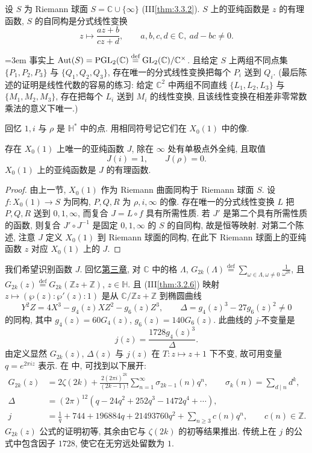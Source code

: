设 $S$ 为 Riemann 球面 $S = \mathbb{C}\cup\{\infty\}$ (III\ref{thm:3.3.2}). $S$ 上的亚纯函数是 $z$ 的有理函数, $S$ 的自同构是分式线性变换
\[
z\mapsto\frac{az+b}{cz+d}, \qquad a, b, c, d\in\mathbb{C}, \ ad-bc\neq 0.
\]
{\emergencystretch=3em 事实上 $\operatorname{Aut}(S) = \mathrm{PGL}_2(\mathbb{C}) \overset{\text{def}}{=} \operatorname{GL}_2(\mathbb{C})/\mathbb{C}^{\times}$. 且给定 $S$ 上两组不同点集 $\{P_1, P_2, P_3\}$ 与 $\{Q_1, Q_2, Q_3\}$, 存在唯一的分式线性变换把每个 $P_i$ 送到 $Q_i$. (最后陈述的证明是线性代数的容易的练习: 给定 $\mathbb{C}^2$ 中两组不同直线 $\{L_1, L_2, L_3\}$ 与 $\{M_1, M_2, M_3\}$, 存在把每个 $L_i$ 送到 $M_i$ 的线性变换, 且该线性变换在相差非零常数乘法的意义下唯一.)\par}

回忆 $1, i$ 与 $\rho$ 是 $\mathbb{H}^*$ 中的点. 用相同符号记它们在 $X_0(1)$ 中的像.

\begin{proposition} \label{thm:5.2.1} 
存在 $X_0(1)$ 上唯一的亚纯函数 $J$, 除在 $\infty$ 处有单极点外全纯, 且取值
\[
J(i) = 1, \qquad J(\rho) = 0.
\]
$X_0(1)$ 上的亚纯函数是 $J$ 的有理函数.
\end{proposition}

\begin{proof}
由上一节, $X_0(1)$ 作为 Riemann 曲面同构于 Riemann 球面 $S$. 设 $f\colon X_0(1)\to S$ 为同构, $P, Q, R$ 为 $\rho, i, \infty$ 的像. 存在唯一的分式线性变换 $L$ 把 $P, Q, R$ 送到 $0, 1, \infty$, 而复合 $J = L\circ f$ 具有所需性质. 若 $J'$ 是第二个具有所需性质的函数, 则复合 $J'\circ J^{-1}$ 是固定 $0, 1, \infty$ 的 $S$ 的自同构, 故是恒等映射. 对第二个陈述, 注意 $J$ 定义 $X_0(1)$ 到 Riemann 球面的同构, 在此下 Riemann 球面上的亚纯函数 $z$ 对应 $X_0(1)$ 上的 $J$.
\end{proof}

我们希望识别函数 $J$. 回忆\hyperref[ch:3]{第三章}, 对 $\mathbb{C}$ 中的格 $\Lambda$, $G_{2k}(\Lambda) \overset{\text{def}}{=} \sum_{\omega\in\Lambda, \omega\neq 0}\frac{1}{\omega^{2k}}$, 且 $G_{2k}(z) \overset{\text{def}}{=} G_{2k}(\mathbb{Z}z + \mathbb{Z})$, $z\in\mathbb{H}$. 且 (III\ref{thm:3.2.6}) 映射 $z\mapsto(\wp(z):\wp'(z):1)$ 是从 $\mathbb{C}/\mathbb{Z}z + \mathbb{Z}$ 到椭圆曲线
\[
Y^2Z = 4X^3 - g_4(z)XZ^2 - g_6(z)Z^3, \qquad \Delta = g_4(z)^3 - 27g_6(z)^2\neq 0
\]
的同构, 其中 $g_4(z) = 60G_4(z)$, $g_6(z) = 140G_6(z)$. 此曲线的 $j$-不变量是
\[
j(z) = \frac{1728g_4(z)^3}{\Delta}.
\]
由定义显然 $G_{2k}(z)$, $\Delta(z)$ 与 $j(z)$ 在 $T\colon z\mapsto z+1$ 下不变, 故可用变量 $q = e^{2\pi iz}$ 表示. 在 \cite[VII, 方程 (23, 33, 42)]{serre1973} 中, 可找到以下展开:
\begin{align}
G_{2k}(z) &= 2\zeta(2k) + \frac{2(2\pi i)^{2k}}{(2k-1)!}\sum_{n=1}^{\infty}\sigma_{2k-1}(n)q^n, \qquad \sigma_k(n) = \sum_{d\mid n}d^k, \tag{42} \label{eq:42} \\
\Delta &= (2\pi)^{12}(q - 24q^2 + 252q^3 - 1472q^4 + \cdots), \tag{43} \label{eq:43} \\
j &= \frac{1}{q} + 744 + 196884q + 21493760q^2 + \sum_{n\ge 3}c(n)q^n, \qquad c(n)\in\mathbb{Z}. \tag{44} \label{eq:44}
\end{align}
$G_{2k}(z)$ 公式的证明初等, 其余由它与 $\zeta(2k)$ 的初等结果推出. 传统上在 $j$ 的公式中包含因子 $1728$, 使它在无穷远处留数为 $1$.

